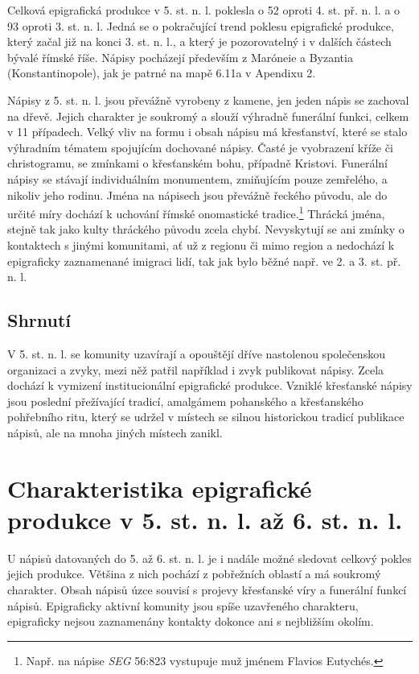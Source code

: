 \NC\AR
\HL
\HL
\stoptable

Celková epigrafická produkce v 5. st. n. l. poklesla o 52  oproti 4. st. př. n. l. a o 93  oproti 3. st. n. l. Jedná se o pokračující trend poklesu epigrafické produkce, který začal již na konci 3. st. n. l., a který je pozorovatelný i v dalších částech bývalé římské říše. Nápisy pocházejí především z Maróneie a Byzantia (Konstantinopole), jak je patrné na mapě 6.11a v Apendixu 2.

Nápisy z 5. st. n. l. jsou převážně vyrobeny z kamene, jen jeden nápis se zachoval na dřevě. Jejich charakter je soukromý a slouží výhradně funerální funkci, celkem v 11 případech. Velký vliv na formu i obsah nápisu má křesťanství, které se stalo výhradním tématem spojujícím dochované nápisy. Časté je vyobrazení kříže či christogramu, se zmínkami o křesťanském bohu, případně Kristovi. Funerální nápisy se stávají individuálním monumentem, zmiňujícím pouze zemřelého, a nikoliv jeho rodinu. Jména na nápisech jsou převážně řeckého původu, ale do určité míry dochází k uchování římské onomastické tradice.\footnote{Např. na nápise {\em SEG} 56:823 vystupuje muž jménem Flavios Eutychés.} Thrácká jména, stejně tak jako kulty thráckého původu zcela chybí. Nevyskytují se ani zmínky o kontaktech s jinými komunitami, ať už z regionu či mimo region a nedochází k epigraficky zaznamenané imigraci lidí, tak jak bylo běžné např. ve 2. a 3. st. př. n. l.

\subsection[shrnutí-23]{Shrnutí}

V 5. st. n. l. se komunity uzavírají a opouštějí dříve nastolenou společenskou organizaci a zvyky, mezi něž patřil například i zvyk publikovat nápisy. Zcela dochází k vymizení institucionální epigrafické produkce. Vzniklé křesťanské nápisy jsou poslední přežívající tradicí, amalgámem pohanského a křesťanského pohřebního ritu, který se udržel v místech se silnou historickou tradicí publikace nápisů, ale na mnoha jiných místech zanikl.

\section[charakteristika-epigrafické-produkce-v-5.-st.-n.-l.-až-6.-st.-n.-l.]{Charakteristika epigrafické produkce v 5. st. n. l. až 6. st. n. l.}

U nápisů datovaných do 5. až 6. st. n. l. je i nadále možné sledovat celkový pokles jejich produkce. Většina z nich pochází z pobřežních oblastí a má soukromý charakter. Obsah nápisů úzce souvisí s projevy křesťanské víry a funerální funkcí nápisů. Epigraficky aktivní komunity jsou spíše uzavřeného charakteru, epigraficky nejsou zaznamenány kontakty dokonce ani s nejbližším okolím.


